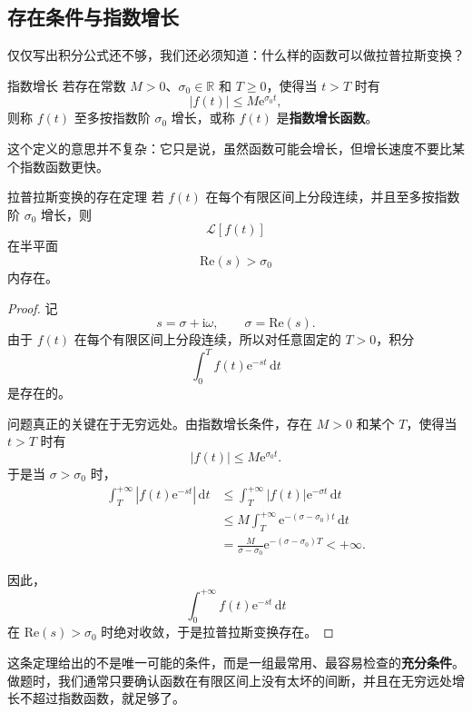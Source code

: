 \subsection{存在条件与指数增长}

仅仅写出积分公式还不够，我们还必须知道：什么样的函数可以做拉普拉斯变换？

\begin{dingliyi}{指数增长}{}
若存在常数 $M>0$、$\sigma_0\in\mathbb{R}$ 和 $T\ge 0$，使得当 $t>T$ 时有
\[
    |f(t)|\le M\mathrm{e}^{\sigma_0 t},
\]
则称 $f(t)$ 至多按指数阶 $\sigma_0$ 增长，或称 $f(t)$ 是\textbf{指数增长函数}。
\end{dingliyi}

这个定义的意思并不复杂：它只是说，虽然函数可能会增长，但增长速度不要比某个指数函数更快。

\begin{dingli}{拉普拉斯变换的存在定理}{}
若 $f(t)$ 在每个有限区间上分段连续，并且至多按指数阶 $\sigma_0$ 增长，则
\[
    \mathcal{L}[f(t)]
\]
在半平面
\[
    \mathrm{Re}(s)>\sigma_0
\]
内存在。
\end{dingli}

\begin{proof}
记
\[
    s=\sigma+\mathrm{i}\omega,
    \qquad \sigma=\mathrm{Re}(s).
\]
由于 $f(t)$ 在每个有限区间上分段连续，所以对任意固定的 $T>0$，积分
\[
    \int_0^T f(t)\mathrm{e}^{-st}\,\mathrm{d}t
\]
是存在的。

问题真正的关键在于无穷远处。由指数增长条件，存在 $M>0$ 和某个 $T$，使得当 $t>T$ 时有
\[
    |f(t)|\le M\mathrm{e}^{\sigma_0 t}.
\]
于是当 $\sigma>\sigma_0$ 时，
\begin{align}
    \int_T^{+\infty} |f(t)\mathrm{e}^{-st}|\,\mathrm{d}t
    &\le
    \int_T^{+\infty} |f(t)|\mathrm{e}^{-\sigma t}\,\mathrm{d}t \\
    &\le
    M\int_T^{+\infty} \mathrm{e}^{-(\sigma-\sigma_0)t}\,\mathrm{d}t \\
    &=
    \frac{M}{\sigma-\sigma_0}\mathrm{e}^{-(\sigma-\sigma_0)T}<+\infty.
\end{align}

因此，
\[
    \int_0^{+\infty} f(t)\mathrm{e}^{-st}\,\mathrm{d}t
\]
在 $\mathrm{Re}(s)>\sigma_0$ 时绝对收敛，于是拉普拉斯变换存在。
\end{proof}

\begin{tishi}[存在定理真正想告诉我们什么]
这条定理给出的不是唯一可能的条件，而是一组最常用、最容易检查的\textbf{充分条件}。做题时，我们通常只要确认函数在有限区间上没有太坏的间断，并且在无穷远处增长不超过指数函数，就足够了。
\end{tishi}

